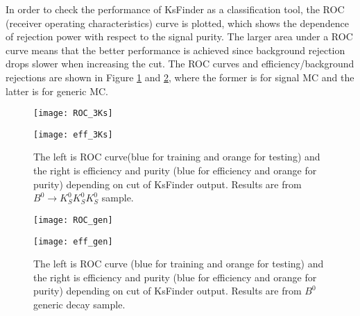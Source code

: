 In order to check the performance of KsFinder as a classification tool, the ROC (receiver operating characteristics) curve is plotted, which shows the dependence of rejection power with respect to the signal purity. The larger area under a ROC curve means that the better performance is achieved since background rejection drops slower when increasing the cut. The ROC curves and efficiency/background rejections are shown in Figure \ref{fig:3Ks_performance} and \ref{fig:gen_performance}, where the former is for signal MC and the latter is for generic MC.

\begin{figure}[H]
	\begin{minipage}[b]{0.5\linewidth}
		\centering 
		\texttt{[image: ROC\_3Ks]}
		\label{fig:ROC_3Ks}
	\end{minipage}
	\begin{minipage}[b]{0.5\linewidth}
		\centering 
		\texttt{[image: eff\_3Ks]}
		\label{fig:eff_3Ks}
	\end{minipage}
\caption{The left is ROC curve(blue for training and orange for testing) and the right is efficiency and purity (blue for efficiency and orange for purity) depending on cut of KsFinder output. Results are from $B^0 \to K_S^0  K_S^0  K_S^0$ sample.}
\label{fig:3Ks_performance}
\end{figure}

\begin{figure}[H]
	\begin{minipage}[b]{0.5\linewidth}
		\centering 
		\texttt{[image: ROC\_gen]}
	\end{minipage}
	\begin{minipage}[b]{0.5\linewidth}
		\centering 
		\texttt{[image: eff\_gen]}
	\end{minipage}
	\caption{The left is ROC curve (blue for training and orange for testing) and the right is efficiency and purity (blue for efficiency and orange for purity) depending on cut of KsFinder output. Results are from $B^0$ generic decay sample.}
	\label{fig:gen_performance}
\end{figure}

\begin{comment}
\begin{figure}[H]
	\begin{minipage}[b]{0.5\linewidth}
		\centering 
		\texttt{[image: jpsi-jpsi]}
		\label{fig:side:a}
	\end{minipage}
	\begin{minipage}[b]{0.5\linewidth}
		\centering 
		\texttt{[image: jpsi-jpsi-pur]}
		\label{fig:side:b}
	\end{minipage}
	\caption{The left is ROC curve and the right is efficiency and purity depending on cut of classifier output. Results are from $B^0 \to J/\psi K_S^0$ generic decay sample.}
\end{figure}
\end{comment}

